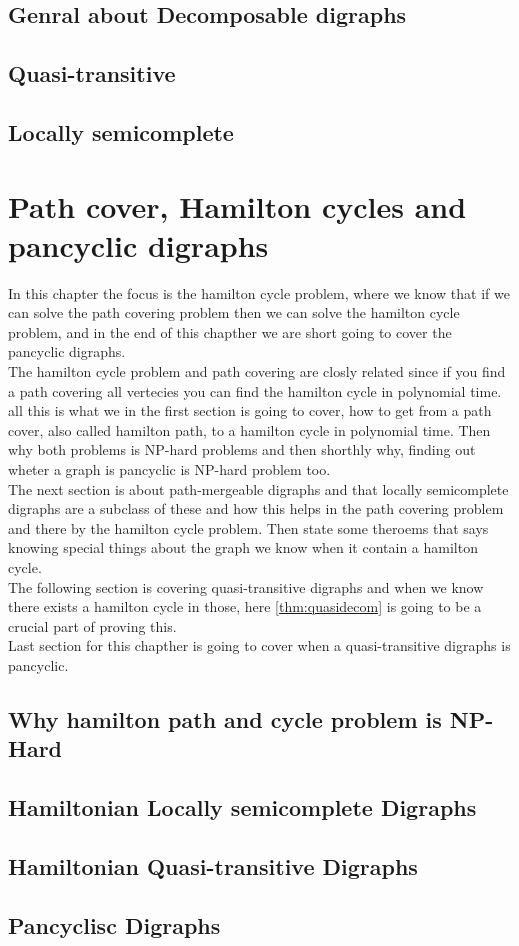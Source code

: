 \section{Genral about Decomposable digraphs}
\label{sec:gdecomposable}

\section{Quasi-transitive}
\label{sec:quasi}

\section{Locally semicomplete}
\label{sec:locally}


\chapter{Path cover, Hamilton cycles and pancyclic digraphs}
\label{chap:hamilton}
In this chapter the focus is the hamilton cycle problem, where we know that if we can solve the path covering problem then we can solve the hamilton cycle problem, and in the end of this chapther we are short going to cover the pancyclic digraphs.\\
The hamilton cycle problem and path covering are closly related since if you find a path covering all vertecies you can find the hamilton cycle in polynomial time. all this is what we in the first section is going to cover, how to get from a path cover, also called hamilton path, to a hamilton cycle in polynomial time. Then why both problems is NP-hard problems and then shorthly why, finding out wheter a graph is pancyclic is NP-hard problem too.\\
The next section is about path-mergeable digraphs and that locally semicomplete digraphs are a subclass of these and how this helps in the path covering problem and there by the hamilton cycle problem. Then state some theroems that says knowing special things about the graph we know when it contain a hamilton cycle. \\
The following section is covering quasi-transitive digraphs and when we know there exists a hamilton cycle in those, here \autoref{thm:quasidecom} is going to be a crucial part of proving this. \\
Last section for this chapther is going to cover when a quasi-transitive digraphs is pancyclic.

\section{Why hamilton path and cycle problem is NP-Hard}
\label{sec:hNP}

\section{Hamiltonian Locally semicomplete Digraphs}
\label{sec:hlocally}

\section{Hamiltonian Quasi-transitive Digraphs}
\label{sec:hquasi}

\section{Pancyclisc Digraphs}
\label{sec:pancyclic}

